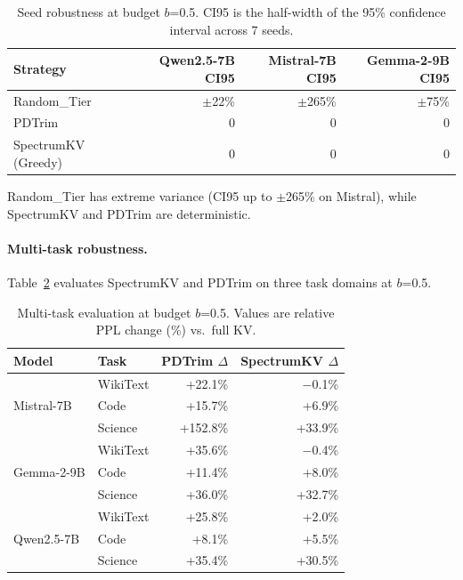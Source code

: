 \documentclass[11pt]{article}
\newcommand{\method}{SpectrumKV}
\newcommand{\pct}{\%}
\theoremstyle{definition}
\theoremstyle{plain}
\begin{document}
\begin{table}[t]
\centering
\caption{Seed robustness at budget $b$=0.5.  CI95 is the half-width of the 95\% confidence interval across 7 seeds.}
\label{tab:seed-robust}
\small
\begin{tabular}{lrrr}
\toprule
Strategy & Qwen2.5-7B CI95 & Mistral-7B CI95 & Gemma-2-9B CI95 \\
\midrule
Random\_Tier & $\pm$22\pct{} & $\pm$265\pct{} & $\pm$75\pct{} \\
PDTrim & 0 & 0 & 0 \\
\method{} (Greedy) & 0 & 0 & 0 \\
\bottomrule
\end{tabular}
\end{table}

Random\_Tier has extreme variance (CI95 up to $\pm$265\pct{} on Mistral), while \method{} and PDTrim are deterministic.

\paragraph{Multi-task robustness.}  Table~\ref{tab:multitask} evaluates \method{} and PDTrim on three task domains at $b$=0.5.

\begin{table}[t]
\centering
\caption{Multi-task evaluation at budget $b$=0.5.  Values are relative PPL change (\%) vs.\ full KV.}
\label{tab:multitask}
\small
\begin{tabular}{llrr}
\toprule
Model & Task & PDTrim $\Delta$ & \method{} $\Delta$ \\
\midrule
\multirow{3}{*}{Mistral-7B} 
 & WikiText & +22.1\pct{} & $-$0.1\pct{} \\
 & Code & +15.7\pct{} & +6.9\pct{} \\
 & Science & +152.8\pct{} & +33.9\pct{} \\
\midrule
\multirow{3}{*}{Gemma-2-9B} 
 & WikiText & +35.6\pct{} & $-$0.4\pct{} \\
 & Code & +11.4\pct{} & +8.0\pct{} \\
 & Science & +36.0\pct{} & +32.7\pct{} \\
\midrule
\multirow{3}{*}{Qwen2.5-7B} 
 & WikiText & +25.8\pct{} & +2.0\pct{} \\
 & Code & +8.1\pct{} & +5.5\pct{} \\
 & Science & +35.4\pct{} & +30.5\pct{} \\
\bottomrule
\end{tabular}
\end{table}
\end{document}
